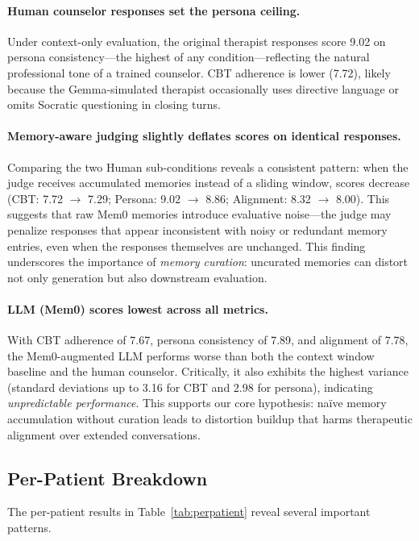 \documentclass{article} %
\begin{document}
\paragraph{Human counselor responses set the persona ceiling.} Under context-only evaluation, the original therapist responses score 9.02 on persona consistency---the highest of any condition---reflecting the natural professional tone of a trained counselor. CBT adherence is lower (7.72), likely because the Gemma-simulated therapist occasionally uses directive language or omits Socratic questioning in closing turns.

\paragraph{Memory-aware judging slightly deflates scores on identical responses.} Comparing the two Human sub-conditions reveals a consistent pattern: when the judge receives accumulated memories instead of a sliding window, scores decrease (CBT: 7.72 $\to$ 7.29; Persona: 9.02 $\to$ 8.86; Alignment: 8.32 $\to$ 8.00). This suggests that raw Mem0 memories introduce evaluative noise---the judge may penalize responses that appear inconsistent with noisy or redundant memory entries, even when the responses themselves are unchanged. This finding underscores the importance of \emph{memory curation}: uncurated memories can distort not only generation but also downstream evaluation.

\paragraph{LLM (Mem0) scores lowest across all metrics.} With CBT adherence of 7.67, persona consistency of 7.89, and alignment of 7.78, the Mem0-augmented LLM performs worse than both the context window baseline and the human counselor. Critically, it also exhibits the highest variance (standard deviations up to 3.16 for CBT and 2.98 for persona), indicating \emph{unpredictable performance}. This supports our core hypothesis: na\"ive memory accumulation without curation leads to distortion buildup that harms therapeutic alignment over extended conversations.

\subsection{Per-Patient Breakdown}

The per-patient results in Table~\ref{tab:perpatient} reveal several important patterns.
\end{document}
